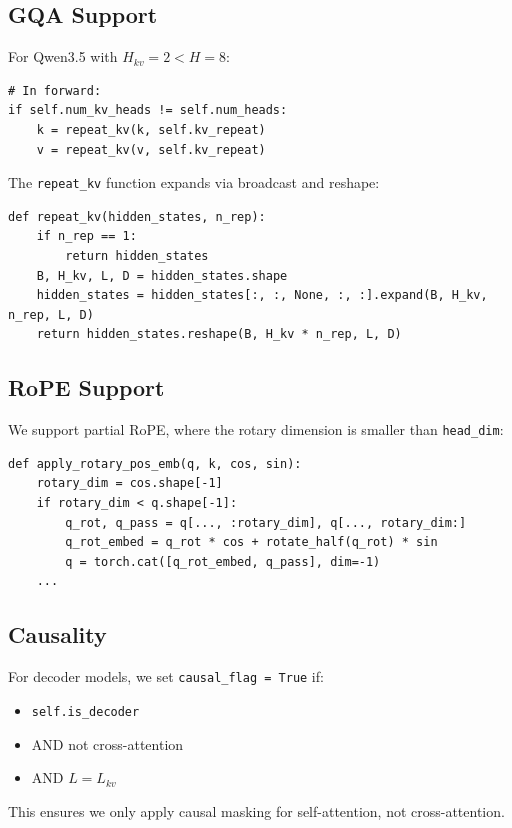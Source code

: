 \subsection{GQA Support}

For Qwen3.5 with $H_{kv} = 2 < H = 8$:

\begin{lstlisting}
# In forward:
if self.num_kv_heads != self.num_heads:
    k = repeat_kv(k, self.kv_repeat)
    v = repeat_kv(v, self.kv_repeat)
\end{lstlisting}

The \texttt{repeat\_kv} function expands via broadcast and reshape:

\begin{lstlisting}
def repeat_kv(hidden_states, n_rep):
    if n_rep == 1:
        return hidden_states
    B, H_kv, L, D = hidden_states.shape
    hidden_states = hidden_states[:, :, None, :, :].expand(B, H_kv, n_rep, L, D)
    return hidden_states.reshape(B, H_kv * n_rep, L, D)
\end{lstlisting}

\subsection{RoPE Support}

We support partial RoPE, where the rotary dimension is smaller than 
\texttt{head\_dim}:

\begin{lstlisting}
def apply_rotary_pos_emb(q, k, cos, sin):
    rotary_dim = cos.shape[-1]
    if rotary_dim < q.shape[-1]:
        q_rot, q_pass = q[..., :rotary_dim], q[..., rotary_dim:]
        q_rot_embed = q_rot * cos + rotate_half(q_rot) * sin
        q = torch.cat([q_rot_embed, q_pass], dim=-1)
    ...
\end{lstlisting}

\subsection{Causality}

For decoder models, we set \texttt{causal\_flag = True} if:
\begin{itemize}
\item \texttt{self.is\_decoder}
\item AND not cross-attention
\item AND $L = L_{kv}$

\end{itemize}
This ensures we only apply causal masking for self-attention, not 
cross-attention.

